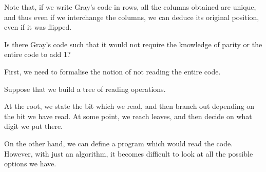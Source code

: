 \documentclass[11pt]{scrartcl}
\begin{document}
  Note that, if we write Gray's code in rows, all the columns obtained
  are unique, and thus even if we interchange the columns, we can
  deduce its original position, even if it was flipped.

  Is there Gray's code such that it would not require the knowledge of
  parity or the entire code to add 1?

  First, we need to formalise the notion of not reading the entire
  code.

  Suppose that we build a tree of reading operations.

  At the root, we state the bit which we read, and then branch out
  depending on the bit we have read. At some point, we reach leaves,
  and then decide on what digit we put there.

  On the other hand, we can define a program which would read the
  code. However, with just an algorithm, it becomes difficult to look
  at all the possible options we have.

  
\end{document}
